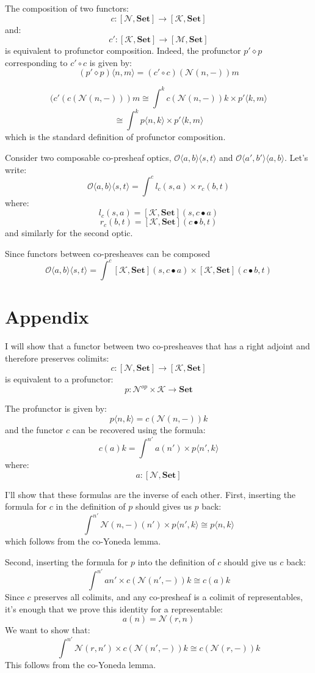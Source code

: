 \documentclass[11pt]{amsart}
\newcommand{\cat}[1]{\mathcal{#1}}%
\newcommand{\Cat}[1]{\mathbf{#1}}%
\newcommand{\Set}{\Cat{Set}}
\begin{document}
The composition of two functors:
\[ c \colon  [\cat N, \Set] \to [\cat K, \Set] \]
and:
\[ c' \colon  [\cat K, \Set] \to [\cat M, \Set] \]
is equivalent to profunctor composition. Indeed, the profunctor $p' \diamond p$ corresponding to $c' \circ c$ is given by:
\[(p' \diamond p) \langle n, m \rangle = (c' \circ c) ( \cat N(n, -)) m \]

\[(c' ( c ( \cat N(n, -))) m 
 \cong \int^{k} c ( \cat N(n, -)) k \times p' \langle k, m \rangle \]
\[  \cong \int^{k} p \langle n, k \rangle \times p' \langle k, m \rangle \]
which is the standard definition of profunctor composition. 

Consider two composable co-presheaf optics, $\mathcal{O}\langle a, b\rangle \langle s, t \rangle$ and $\mathcal{O}\langle a', b' \rangle \langle a, b \rangle$. Let's write:
\[ \mathcal{O}\langle a, b\rangle \langle s, t \rangle = \int^{c}  l_c (s,  a ) \times r_c (b, t) \]
 where:
\[ l_c (s,  a ) = [\cat K, \Set] \left(s,  c \bullet a \right) \] 
\[ r_c (b, t) = [\cat K, \Set] \left(c \bullet b, t \right) \]
and similarly for the second optic.


Since functors between co-presheaves can be composed
\[ \mathcal{O}\langle a, b\rangle \langle s, t \rangle = \int^{c} 
 [\cat K, \Set] \left(s,  c \bullet a \right) \times 
 [\cat K, \Set] \left(c \bullet b, t \right) \]


\section{Appendix}

I will show that a functor between two co-presheaves that has a right adjoint and therefore preserves colimits:
\[ c \colon [\cat N, \Set] \to [\cat K, \Set] \]
is equivalent to a profunctor:
\[p \colon \cat N^{op} \times \cat K \to \Set \]

The profunctor is given by:
\[p \langle n, k \rangle = c ( \cat N(n, -)) k \]
and the functor $c$ can be recovered using the formula:
\[ c (a) k = \int^{n'} a (n') \times p \langle n', k \rangle \]
where:
\[ a \colon [\cat N, \Set] \]

I'll show that these formulas are the inverse of each other. First, inserting the formula for $c$ in the definition of $p$ should gives us $p$ back:
\[  \int^{n'} \cat N(n, -) (n') \times p\langle n', k \rangle \cong  p \langle n, k \rangle \]
which follows from the co-Yoneda lemma.

Second, inserting the formula for $p$ into the definition of $c$ should give us $c$ back:
\[  \int^{n'} a n' \times c(\cat N(n', -)) k  \cong c (a) k  \]
Since $c$ preserves all colimits, and any co-presheaf is a colimit of representables, it's enough that we prove this identity for a representable:
\[ a (n) = \cat N (r, n) \]
We want to show that:
\[ \int^{n'}  \cat N (r, n')  \times  c(\cat N(n', -)) k \cong  c ( \cat N (r, -) ) k\]
This follows from the co-Yoneda lemma.
\end{document}
